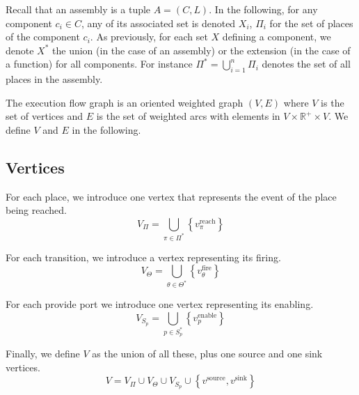 Recall that an assembly is a tuple $A = (C,L)$. In the following, for
any component $c_i \in C$, any of its associated set is denoted
$X_i$, \eg $\Pi_i$ for the set of places of the component $c_i$.  As
previously, for each set $X$ defining a component, we denote $X^*$ the
union (in the case of an assembly) or the extension (in the case of a
function) for all components. For instance
$\Pi^*=\bigcup_{i=1}^{n}\Pi_i$ denotes the set of all places in the
assembly.

The execution flow graph is an oriented weighted graph $\left(V,E\right)$
where $V$ is the set of vertices and $E$ is the set of weighted
arcs with elements in $V\times \mathbb{R}^{+} \times V$. We define
$V$ and $E$ in the following.

\subsection{Vertices}

For each place, we introduce one vertex that represents the event of
the place being reached.
\[
V_{\Pi}=\bigcup_{\pi\in\Pi^*}\left\{ v_\pi^\text{reach}\right\} 
\]


For each transition, we introduce a vertex representing its firing.
\[
V_{\Theta}=\bigcup_{\theta\in\Theta^*}\left\{ v_\theta^\text{fire}\right\} 
\]


For each provide port we introduce one vertex representing its
enabling.
\[
V_{S_p}=\bigcup_{p\in S_p^*} \left\{ v_p^\text{enable}\right\} 
\]

Finally, we define $V$ as the union of all these, plus one source
and one sink vertices. 
\[
V=V_{\Pi}\cup V_{\Theta} \cup V_{S_p} \cup \left\{ v^\text{source},v^\text{sink}\right\} 
\]

